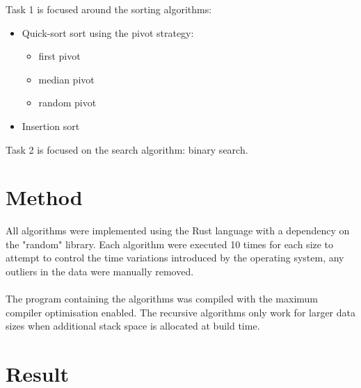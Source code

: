 \documentclass{article}
\begin{document}
Task 1 is focused around the sorting algorithms:
\begin{itemize}
	\item Quick-sort sort using the pivot strategy:
	\begin{itemize}
	    \item first pivot
	    \item median pivot
	    \item random pivot
	\end{itemize}
	\item Insertion sort
\end{itemize}

Task 2 is focused on the search algorithm: binary search. 

\section{Method}
All algorithms were implemented using the Rust language with a dependency on the "random" library. Each algorithm were executed 10 times for each size to attempt to control the time variations introduced by the operating system, any outliers in the data were manually removed. \\ \\
The program containing the algorithms was compiled with the maximum compiler optimisation enabled. The recursive algorithms only work for larger data sizes when additional stack space is allocated at build time. 

\newpage
\section{Result}
\end{document}
